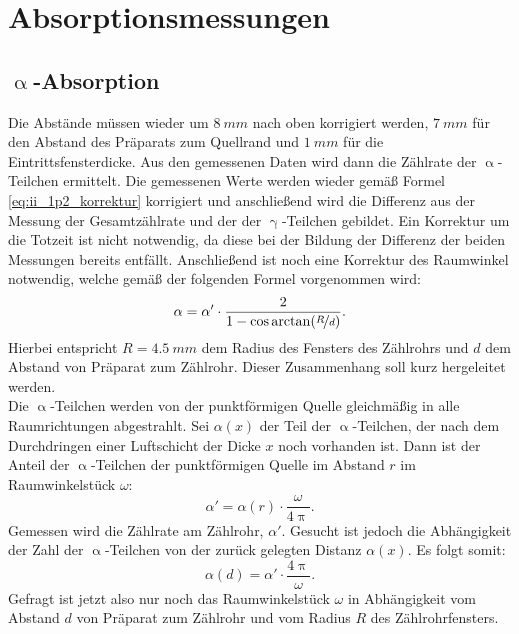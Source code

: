 \FloatBarrier
\section{Absorptionsmessungen}
\subsection{\texorpdfstring{$\upalpha$}{Alpha}-Absorption}
Die Abstände müssen wieder um $\SI{8}{mm}$ nach oben korrigiert werden, $\SI{7}{mm}$ für den Abstand des Präparats zum Quellrand und $\SI{1}{mm}$ für die Eintrittsfensterdicke. Aus den gemessenen Daten wird dann die Zählrate der $\upalpha$-Teilchen ermittelt. Die gemessenen Werte werden wieder gemäß Formel \eqref{eq:ii_1p2_korrektur} korrigiert und anschließend wird die Differenz aus der Messung der Gesamtzählrate und der der $\upgamma$-Teilchen gebildet. Ein Korrektur um die Totzeit ist nicht notwendig, da diese bei der Bildung der Differenz der beiden Messungen bereits entfällt. Anschließend ist noch eine Korrektur des Raumwinkel notwendig, welche gemäß der folgenden Formel vorgenommen wird:
\begin{equation}
\alpha = \alpha' \cdot \frac{2}{1-\cos\arctan(\nicefrac{R}{d})}.\label{eq:ii_2_winkel}
\end{equation}
Hierbei entspricht $R = \SI{4,5}{mm}$ dem Radius des Fensters des Zählrohrs und $d$ dem Abstand von Präparat zum Zählrohr. Dieser Zusammenhang soll kurz hergeleitet werden.\\
Die $\upalpha$-Teilchen werden von der punktförmigen Quelle gleichmäßig in alle Raumrichtungen abgestrahlt. Sei $\alpha(x)$ der Teil der $\upalpha$-Teilchen, der nach dem Durchdringen einer Luftschicht der Dicke $x$ noch vorhanden ist. Dann ist der Anteil der $\upalpha$-Teilchen der punktförmigen Quelle im Abstand $r$ im Raumwinkelstück $\omega$:
\begin{equation}
\alpha' = \alpha(r) \cdot \frac{\omega}{4 \uppi}.\label{eq:ii_2_abh}
\end{equation}
Gemessen wird die Zählrate am Zählrohr, $\alpha'$. Gesucht ist jedoch die Abhängigkeit der Zahl der $\upalpha$-Teilchen von der zurück gelegten Distanz $\alpha(x)$. Es folgt somit:
\begin{equation}
\alpha(d) = \alpha' \cdot \frac{4\uppi}{\omega}.
\end{equation}
Gefragt ist jetzt also nur noch das Raumwinkelstück $\omega$ in Abhängigkeit vom Abstand $d$ von Präparat zum Zählrohr und vom Radius $R$ des Zählrohrfensters.\\
